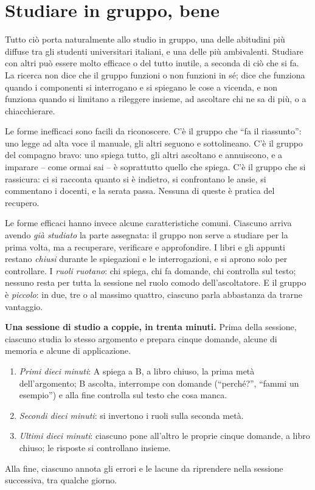 \section{Studiare in gruppo, bene}

Tutto ciò porta naturalmente allo studio in gruppo, una delle
abitudini più diffuse tra gli studenti universitari italiani, e una
delle più ambivalenti. Studiare con altri può essere molto efficace o
del tutto inutile, a seconda di ciò che si fa. La ricerca non dice che
il gruppo funzioni o non funzioni in sé; dice che funziona quando i
componenti si interrogano e si spiegano le cose a vicenda, e non
funziona quando si limitano a rileggere insieme, ad ascoltare chi ne sa
di più, o a chiacchierare.

Le forme inefficaci sono facili da riconoscere. C'è il gruppo che
\enquote{fa il riassunto}: uno legge ad alta voce il manuale, gli altri
seguono e sottolineano. C'è il gruppo del compagno bravo: uno spiega
tutto, gli altri ascoltano e annuiscono, e a imparare -- come ormai sai
-- è soprattutto quello che spiega. C'è il gruppo che si rassicura:
ci si racconta quanto si è indietro, si confrontano le ansie, si
commentano i docenti, e la serata passa. Nessuna di queste è pratica
del recupero.

Le forme efficaci hanno invece alcune caratteristiche comuni. Ciascuno
arriva avendo \emph{già studiato} la parte assegnata: il gruppo non
serve a studiare per la prima volta, ma a recuperare, verificare e
approfondire. I libri e gli appunti restano \emph{chiusi} durante le
spiegazioni e le interrogazioni, e si aprono solo per controllare. I
\emph{ruoli ruotano}: chi spiega, chi fa domande, chi controlla sul
testo; nessuno resta per tutta la sessione nel ruolo comodo
dell'ascoltatore. E il gruppo è \emph{piccolo}: in due, tre o al
massimo quattro, ciascuno parla abbastanza da trarne vantaggio.

\begin{inpratica}
\textbf{Una sessione di studio a coppie, in trenta minuti.} Prima della
sessione, ciascuno studia lo stesso argomento e prepara cinque domande,
alcune di memoria e alcune di applicazione.
\begin{enumerate}
  \item \emph{Primi dieci minuti}: A spiega a B, a libro chiuso, la
        prima metà dell'argomento; B ascolta, interrompe con domande
        (\enquote{perché?}, \enquote{fammi un esempio}) e alla fine
        controlla sul testo che cosa manca.
  \item \emph{Secondi dieci minuti}: si invertono i ruoli sulla seconda
        metà.
  \item \emph{Ultimi dieci minuti}: ciascuno pone all'altro le proprie
        cinque domande, a libro chiuso; le risposte si controllano
        insieme.
\end{enumerate}
Alla fine, ciascuno annota gli errori e le lacune da riprendere nella
sessione successiva, tra qualche giorno.
\end{inpratica}

